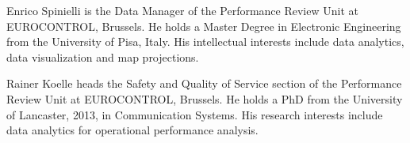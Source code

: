 \documentclass[conference,final,a4paper,]{IEEEtran}
\begin{document}
\vspace*{-3\baselineskip}

\begin{IEEEbiographynophoto}{\normalsize Enrico Spinielli}\normalsize
is the Data Manager of the Performance Review Unit at EUROCONTROL, Brussels.
He holds a Master Degree in Electronic Engineering from the University of Pisa, Italy.
His intellectual interests include data analytics, data visualization and
map projections.
\end{IEEEbiographynophoto}

\vspace*{-2.5\baselineskip}

\begin{IEEEbiographynophoto}{\normalsize Rainer Koelle}\normalsize
heads the Safety and Quality of Service section
of the Performance Review Unit at EUROCONTROL, Brussels.
He holds a PhD from the University of Lancaster, 2013, in Communication Systems.
His research interests include data analytics for operational performance analysis.
\end{IEEEbiographynophoto}

\vfill
\end{document}
